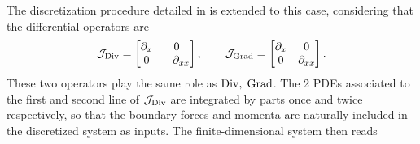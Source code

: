 The discretization procedure detailed in  is extended to this case, considering that the differential operators are 
\[
{\mathcal{J}}_{\operatorname*{Div}} = \begin{bmatrix}
\partial_x & 0 \\
0 & -\partial_{xx} \\
\end{bmatrix}, \qquad 
\mathcal{J}_{\operatorname*{Grad}} = \begin{bmatrix}
\partial_x & 0 \\
0 & \partial_{xx} \\
\end{bmatrix}.
\]
These two operators play the same role as $\operatorname*{Div}, \; \operatorname*{Grad}$. The 2 PDEs associated to the first and second line of $\mathcal{J}_{\operatorname*{Div}}$ are integrated by parts once and twice respectively, so that the boundary forces and momenta are naturally included in the discretized system as inputs. The finite-dimensional system then reads
